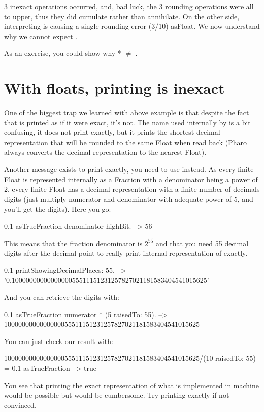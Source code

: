 \documentclass[a4paper,10pt,twoside]{book}
\begin{document}
3 inexact operations occurred, and, bad luck, the 3 rounding operations were all to upper, thus they did cumulate rather than annihilate.
On the other side, interpreting  is causing a single rounding error (3/10) asFloat.
We now understand why we cannot expect .

As an exercise, you could show why  *   $\neq$ .


\section{With floats, printing is inexact}

One of the biggest trap we learned with above example is that despite the fact that  is printed  as if it were exact, it's not.
The name  used internally by  is a bit confusing, it does not print exactly,
but it prints the shortest decimal representation that will be rounded
to the same Float when read back (Pharo always converts the decimal representation to the nearest Float).

Another message exists to print exactly, you need to use  instead.
As every finite Float is  represented internally as a Fraction with a
denominator being a power of 2, every finite Float has a decimal
representation with a finite number of decimals digits (just multiply
numerator and denominator with adequate power of 5, and you'll get the
digits). Here you go:

\begin{code}{}
0.1 asTrueFraction denominator highBit.
	-->  56
\end{code}

This means that the fraction denominator is $2^{55}$ and that you need 55 decimal digits after the decimal point to really print internal representation of  exactly.
\begin{code}{}
0.1 printShowingDecimalPlaces: 55.
	--> '0.1000000000000000055511151231257827021181583404541015625'
\end{code}
And you can retrieve the digits with:
\begin{code}{}
0.1 asTrueFraction numerator * (5 raisedTo: 55).
	-->  1000000000000000055511151231257827021181583404541015625
\end{code}
You can just check our result with:
\begin{code}{}
1000000000000000055511151231257827021181583404541015625/(10 raisedTo: 55) =  0.1 asTrueFraction
	--> true
\end{code}
You see that printing the exact representation of what is implemented in machine would be possible but would be cumbersome. Try printing  exactly if not convinced.
\end{document}
